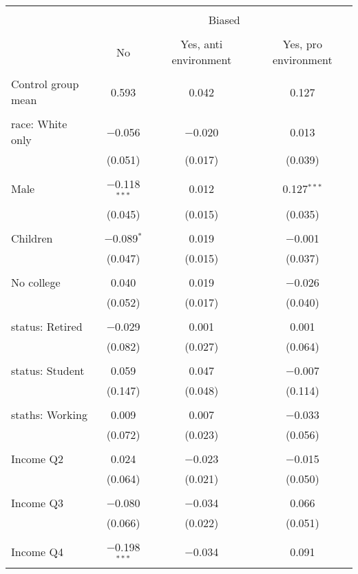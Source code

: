 
\begin{tabular}{@{\extracolsep{5pt}}lccc} 
\\[-1.8ex]\hline 
\hline \\[-1.8ex] 
 & \multicolumn{3}{c}{Biased} \\ 
\cline{2-4} 
\\[-1.8ex] & No & Yes, anti environment & Yes, pro environment \\ 
\hline \\[-1.8ex] 
 Control group mean & 0.593 & 0.042 & 0.127  \\ \hline \\[-1.8ex] race: White only & $-$0.056 & $-$0.020 & 0.013 \\ 
  & (0.051) & (0.017) & (0.039) \\ 
  & & & \\ 
 Male & $-$0.118$^{***}$ & 0.012 & 0.127$^{***}$ \\ 
  & (0.045) & (0.015) & (0.035) \\ 
  & & & \\ 
 Children & $-$0.089$^{*}$ & 0.019 & $-$0.001 \\ 
  & (0.047) & (0.015) & (0.037) \\ 
  & & & \\ 
 No college & 0.040 & 0.019 & $-$0.026 \\ 
  & (0.052) & (0.017) & (0.040) \\ 
  & & & \\ 
 status: Retired & $-$0.029 & 0.001 & 0.001 \\ 
  & (0.082) & (0.027) & (0.064) \\ 
  & & & \\ 
 status: Student & 0.059 & 0.047 & $-$0.007 \\ 
  & (0.147) & (0.048) & (0.114) \\ 
  & & & \\ 
 staths: Working & 0.009 & 0.007 & $-$0.033 \\ 
  & (0.072) & (0.023) & (0.056) \\ 
  & & & \\ 
 Income Q2 & 0.024 & $-$0.023 & $-$0.015 \\ 
  & (0.064) & (0.021) & (0.050) \\ 
  & & & \\ 
 Income Q3 & $-$0.080 & $-$0.034 & 0.066 \\ 
  & (0.066) & (0.022) & (0.051) \\ 
  & & & \\ 
 Income Q4 & $-$0.198$^{***}$ & $-$0.034 & 0.091 \\ 

\end{tabular}

